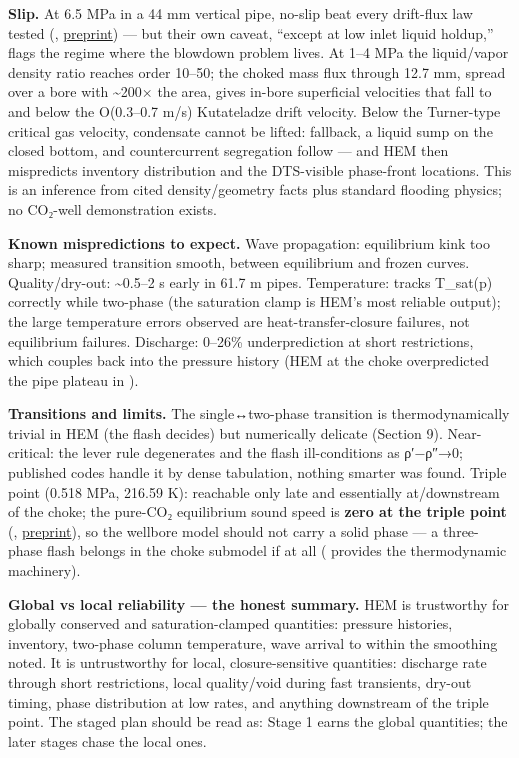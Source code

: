 \textbf{Slip.} At 6.5 MPa in a 44 mm vertical pipe, no-slip beat every
drift-flux law tested
(\citealp{hammer2021}, \href{https://www.pvv.ntnu.no/~stm/dring/driftflux-well.pdf}{preprint}) --- but their own caveat, ``except at low inlet liquid
holdup,'' flags the regime where the blowdown problem lives. At 1--4 MPa
the liquid/vapor density ratio reaches order 10--50; the choked mass
flux through 12.7 mm, spread over a bore with \textasciitilde200× the
area, gives in-bore superficial velocities that fall to and below the
O(0.3--0.7 m/s) Kutateladze drift velocity. Below the Turner-type
critical gas velocity, condensate cannot be lifted: fallback, a liquid
sump on the closed bottom, and countercurrent segregation follow --- and
HEM then mispredicts inventory distribution and the DTS-visible
phase-front locations. This is an inference from cited density/geometry
facts plus standard flooding physics; no CO₂-well demonstration exists.

\textbf{Known mispredictions to expect.} Wave propagation: equilibrium
kink too sharp; measured transition smooth, between equilibrium and
frozen curves. Quality/dry-out: \textasciitilde0.5--2 s early in 61.7 m
pipes. Temperature: tracks T\_sat(p) correctly while two-phase (the
saturation clamp is HEM's most reliable output); the large temperature
errors observed are heat-transfer-closure failures, not equilibrium
failures. Discharge: 0--26\% underprediction at short restrictions,
which couples back into the pressure history (HEM at the choke
overpredicted the pipe plateau in \citealp{hammer2022}).

\textbf{Transitions and limits.} The single↔two-phase transition is
thermodynamically trivial in HEM (the flash decides) but numerically
delicate (Section 9). Near-critical: the lever rule degenerates and the
flash ill-conditions as ρ′−ρ″→0; published codes handle it by dense
tabulation, nothing smarter was found. Triple point (0.518 MPa, 216.59
K): reachable only late and essentially at/downstream of the choke; the
pure-CO₂ equilibrium sound speed is \textbf{zero at the triple point}
(\citealp{munkejord2021}, \href{https://www.pvv.ntnu.no/~stm/dring/depress-mix-exp.pdf}{preprint}), so the wellbore model should not carry a solid phase
--- a three-phase flash belongs in the choke submodel if at all (\citealp{hammer2013} provides the thermodynamic machinery).

\textbf{Global vs local reliability --- the honest summary.} HEM is
trustworthy for globally conserved and saturation-clamped quantities:
pressure histories, inventory, two-phase column temperature, wave
arrival to within the smoothing noted. It is untrustworthy for local,
closure-sensitive quantities: discharge rate through short restrictions,
local quality/void during fast transients, dry-out timing, phase
distribution at low rates, and anything downstream of the triple point.
The staged plan should be read as: Stage 1 earns the global quantities;
the later stages chase the local ones.

